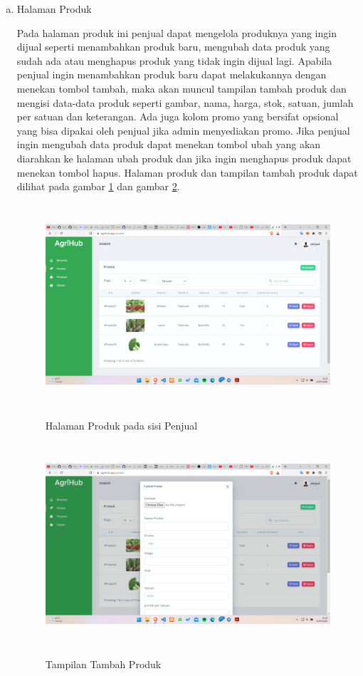 \begin{enumerate}
\begin{enumerate}[a.]
		\item Halaman Produk
		\par Pada halaman produk ini penjual dapat mengelola produknya yang ingin dijual seperti menambahkan produk baru, mengubah data produk yang sudah ada atau menghapus produk yang tidak ingin dijual lagi. Apabila penjual ingin menambahkan produk baru dapat melakukannya dengan menekan tombol tambah, maka akan muncul tampilan tambah produk dan mengisi data-data produk seperti gambar, nama, harga, stok, satuan, jumlah per satuan dan keterangan. Ada juga kolom promo yang bersifat opsional yang bisa dipakai oleh penjual jika admin menyediakan promo. Jika penjual ingin mengubah data produk dapat menekan tombol ubah yang akan diarahkan ke halaman ubah produk dan jika ingin menghapus produk dapat menekan tombol hapus. Halaman produk dan tampilan tambah produk dapat dilihat pada gambar \ref*{produk_penjual} dan gambar \ref*{tambah_produk}.
		\begin{figure}[H]
			\centering
			{\includegraphics [width = 13cm, height= 7.5cm]{gambar/penjual/produk_penjual}}
			\caption{Halaman Produk pada sisi Penjual}
			\label{produk_penjual}
		\end{figure}
		\begin{figure}[H]
			\centering
			{\includegraphics [width = 13cm, height= 7.5cm]{gambar/penjual/tambah_produk}}
			\caption{Tampilan Tambah Produk}
			\label{tambah_produk}
		\end{figure}


\end{enumerate}
\end{enumerate}
